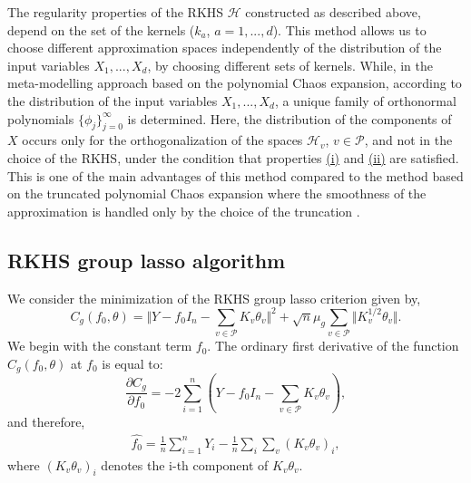 The regularity properties of the RKHS $\mathcal{H}$ constructed as described above, depend on the set of the kernels ($k_{a}$, $a=1,...,d$). This method allows us to choose different approximation spaces independently of the distribution of the input variables $X_1,...,X_d$, by choosing different sets of kernels. While, in the meta-modelling approach based on the polynomial Chaos expansion, according to the distribution of the input variables $X_1,...,X_d$, a unique family of orthonormal polynomials $\{\phi_j\}_{j=0}^\infty$ is determined.
Here, the distribution of the components of $X$ occurs only for the orthogonalization of the spaces $\mathcal{H}_v$, $v\in\mathcal{P}$, and not in the choice of the RKHS, under the condition that properties \hyperref[intro:idurr]{(i)} and \hyperref[intro:iidurr]{(ii)} are satisfied. This is one of the main advantages of this method compared to the method based on the truncated polynomial Chaos expansion where the smoothness of the approximation is handled only by the choice of the truncation \citep{BlatmanSudret}. 
\subsection{RKHS group lasso algorithm}\label{appendix:gls}
We consider the minimization of the RKHS group lasso criterion given by,
$$C_g(f_0,\theta)=\Vert Y-f_0I_n-\sum_{v\in\mathcal{P}}K_v\theta_v\Vert^2+\sqrt{n}\mu_g\sum_{v\in\mathcal{P}}\Vert K_v^{1/2}\theta_v\Vert .$$ 
We begin with the constant term $f_0$. The ordinary first derivative of the function $C_g(f_0,\theta)$ at $f_0$ is equal to:
\begin{equation*}
\frac{\partial C_g}{\partial f_0}=-2\sum_{i=1}^n(Y-f_0I_n-\sum_{v\in\mathcal{P}}K_v\theta_v),
\end{equation*}
and therefore, 
\begin{align}\label{fzchapo}
\widehat{f_0}=\frac{1}{n}\sum_{i=1}^n{Y_i}-\frac{1}{n}\sum_i\sum_v(K_v\theta_v)_i,
\end{align}
where $(K_v\theta_v)_i$ denotes the i-th component of $K_v\theta_v$. 

